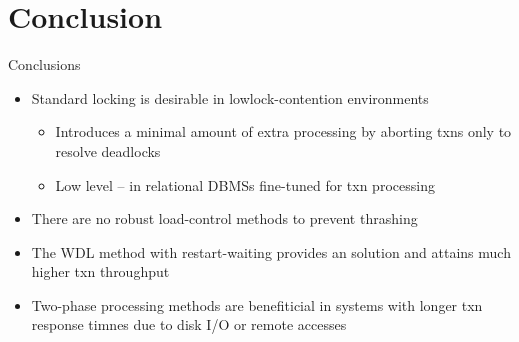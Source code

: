 \documentclass[sans]{beamer}
\begin{document}
\section{Conclusion}

\begin{frame}{Conclusions}
  \begin{itemize}
    \item Standard locking is desirable in lowlock-contention
      environments
      \begin{itemize}
        \item Introduces a minimal amount of extra processing by
          aborting txns only to resolve deadlocks
        \item Low level -- in relational DBMSs fine-tuned for
          txn processing
      \end{itemize}
    \item There are no robust load-control methods to prevent thrashing
    \item The WDL method with restart-waiting provides an solution and
      attains much higher txn throughput
    \item Two-phase processing methods are benefiticial in systems with
      longer txn response timnes due to disk I/O or remote accesses
   \end{itemize}
\end{frame}
\end{document}
